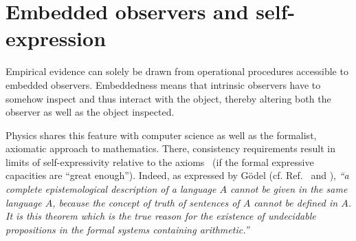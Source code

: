 \chapter{Embedded observers and self-expression}
\label{2016-pu-book-chapter-eo} %



Empirical evidence  can solely be drawn from operational
procedures accessible to embedded observers.
Embeddedness means that intrinsic observers have to somehow inspect and thus interact with the object,
thereby altering both the observer as well as the object inspected.

Physics shares this feature with computer science as well as the formalist,
axiomatic approach to mathematics.
There, consistency requirements result in limits of self-expressivity
relative to the axioms~\cite{Lawvere1969,Yanofsky-BSL:9051621} (if the formal expressive capacities are ``great enough'').
Indeed, as expressed by
G\"odel (cf. Ref.~\cite[p.~55]{v-neumann-66} and \cite[p.~554]{fef-84}),
{\em ``a complete epistemological description
 of a language $A$ cannot be given in the same language $A$, because
 the concept of truth of sentences of $A$ cannot be defined in $A$. It
 is this theorem which is the true reason for the existence of
 undecidable propositions in the formal systems containing arithmetic.''}

